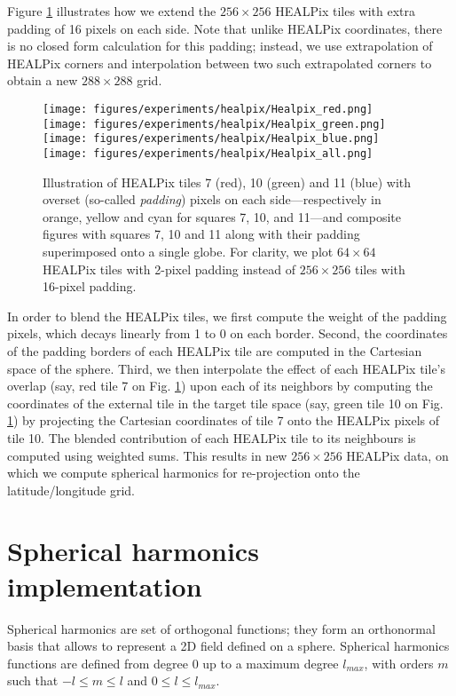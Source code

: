 \documentclass[11pt, a4paper, logo, copyright, numbering]{googledeepmind}
\begin{document}
Figure \ref{fig:overset} illustrates how we extend the $256 \times 256$ HEALPix tiles with extra padding of 16 pixels on each side. Note that unlike HEALPix coordinates, there is no closed form calculation for this padding; instead, we use extrapolation of HEALPix corners and interpolation between two such extrapolated corners to obtain a new $288 \times 288$ grid.

\begin{figure}
    \centering
    \texttt{[image: figures/experiments/healpix/Healpix\_red.png]}
    \texttt{[image: figures/experiments/healpix/Healpix\_green.png]}
    \texttt{[image: figures/experiments/healpix/Healpix\_blue.png]}
    \texttt{[image: figures/experiments/healpix/Healpix\_all.png]}
    \hfill
    \caption{Illustration of HEALPix tiles 7 (red), 10 (green) and 11 (blue) with overset (so-called \emph{padding}) pixels on each side---respectively in orange, yellow and cyan for squares 7, 10, and 11---and composite figures with squares 7, 10 and 11 along with their padding superimposed onto a single globe. For clarity, we plot $64 \times 64$ HEALPix tiles with 2-pixel padding instead of $256 \times 256$ tiles with 16-pixel padding.}
    \label{fig:overset}
\end{figure}

In order to blend the HEALPix tiles, we first compute the weight of the padding pixels, which decays linearly from 1 to 0 on each border.
Second, the coordinates of the padding borders of each HEALPix tile are computed in the Cartesian space of the sphere. Third, we then interpolate the effect of each HEALPix tile's overlap (say, red tile 7 on Fig. \ref{fig:overset}) upon each of its neighbors by computing the coordinates of the external tile in the target tile space (say, green tile 10 on Fig. \ref{fig:overset}) by projecting the Cartesian coordinates of tile 7 onto the HEALPix pixels of tile 10. The blended contribution of each HEALPix tile to its neighbours is computed using weighted sums. This results in new $256 \times 256$ HEALPix data, on which we compute spherical harmonics for re-projection onto the latitude/longitude grid.
 
\section{Spherical harmonics implementation}
\label{sx:appendix:spherical_harmonics}
Spherical harmonics are set of orthogonal functions; they form an orthonormal basis that allows to represent a 2D field defined on a sphere. Spherical harmonics functions are defined from degree 0 up to a maximum degree $l_{max}$, with orders $m$ such that $-l \leq m \leq l$ and $0 \leq l \leq l_{max}$.
\end{document}
